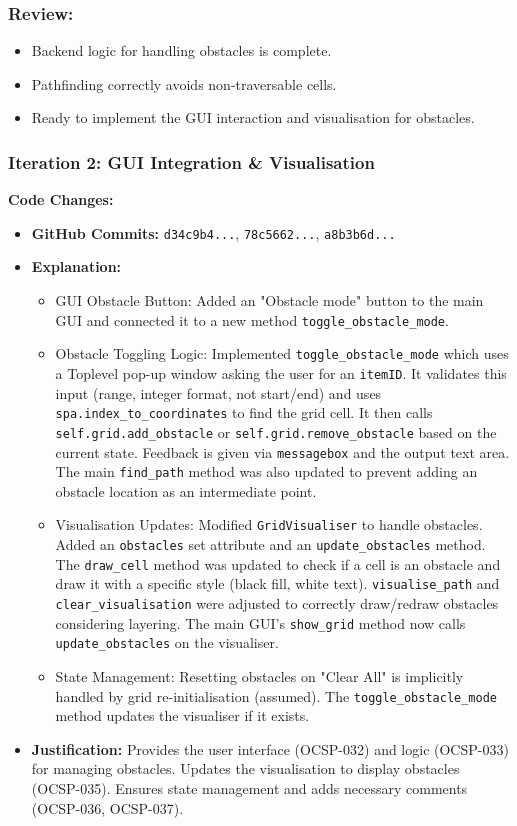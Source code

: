 \subsubsection{Review:}
\begin{itemize}
	\item Backend logic for handling obstacles is complete.
	\item Pathfinding correctly avoids non-traversable cells.
	\item Ready to implement the GUI interaction and visualisation for obstacles.
\end{itemize}

\newpage

\subsubsection{Iteration 2: GUI Integration \& Visualisation}

\textbf{Code Changes:}
\begin{itemize}
	\item \textbf{GitHub Commits:} \verb|d34c9b4...|, \verb|78c5662...|, \verb|a8b3b6d...|
	\item \textbf{Explanation:}
	\begin{itemize}
	    \item GUI Obstacle Button: Added an "Obstacle mode" button to the main GUI and connected it to a new method \verb|toggle_obstacle_mode|.
		\item Obstacle Toggling Logic: Implemented \verb|toggle_obstacle_mode| which uses a Toplevel pop-up window asking the user for an \verb|itemID|. It validates this input (range, integer format, not start/end) and uses \verb|spa.index_to_coordinates| to find the grid cell. It then calls \verb|self.grid.add_obstacle| or \verb|self.grid.remove_obstacle| based on the current state. Feedback is given via \verb|messagebox| and the output text area. The main \verb|find_path| method was also updated to prevent adding an obstacle location as an intermediate point.
		\item Visualisation Updates: Modified \verb|GridVisualiser| to handle obstacles. Added an \verb|obstacles| set attribute and an \verb|update_obstacles| method. The \verb|draw_cell| method was updated to check if a cell is an obstacle and draw it with a specific style (black fill, white text). \verb|visualise_path| and \verb|clear_visualisation| were adjusted to correctly draw/redraw obstacles considering layering. The main GUI's \verb|show_grid| method now calls \verb|update_obstacles| on the visualiser.
		\item State Management: Resetting obstacles on "Clear All" is implicitly handled by grid re-initialisation (assumed). The \verb|toggle_obstacle_mode| method updates the visualiser if it exists.
	\end{itemize}
	\item \textbf{Justification:} Provides the user interface (OCSP-032) and logic (OCSP-033) for managing obstacles. Updates the visualisation to display obstacles (OCSP-035). Ensures state management and adds necessary comments (OCSP-036, OCSP-037).
\end{itemize}

